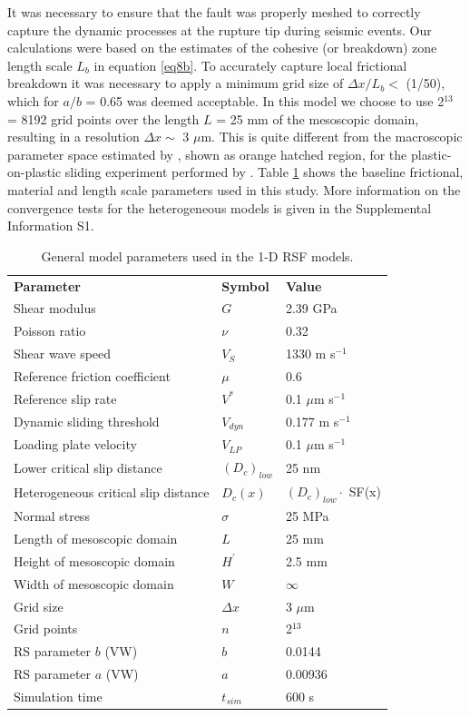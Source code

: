 \documentclass[preprint,1p, 10pt,authoryear]{elsarticle}
\begin{document}
It was necessary to ensure that the fault was properly meshed to correctly capture the dynamic processes at the rupture tip during seismic events. Our calculations were based on the estimates of the cohesive (or breakdown) zone length scale $L_{b}$ in equation \eqref{eq8b}. To accurately capture local frictional breakdown it was necessary to apply a minimum grid size of $\Delta x/L_{b} <$ (1/50), which for $a/b$ = 0.65 was deemed acceptable.  In this model we choose to use 2$^{13}$ = 8192 grid points over the length $L$ = 25 mm of the mesoscopic domain, resulting in a resolution $\Delta x \sim$  3 $\mu$m. This is quite different from the macroscopic parameter space estimated by \citet{Kaneko2016}, shown as orange hatched region, for the plastic-on-plastic sliding experiment performed by \citet{Latour2013}. Table \ref{table1} shows the baseline frictional, material and length scale parameters used in this study. More information on the convergence tests for the heterogeneous models is given in the Supplemental Information S1.

\begin{table}[ht]
	\centering
	\caption{General model parameters used in the 1-D RSF models.}
	\begin{tabular}{ m{5cm} m{2cm} m{4cm}} 
		\hline  
		\bf{Parameter} 			& \bf{Symbol} 		& \bf{Value}	\\
		Shear modulus  			& $G$  		 	& 2.39 GPa		\\
		Poisson ratio  			& $\nu$  	 	& 0.32 		\\
		Shear wave speed		& $V_{S}$      		& 1330 m s$^{-1}$	\\
		Reference friction coefficient	& $\mu$	        & 0.6	\\
		Reference slip rate  		& $V^{*}$     		&  0.1 $\mu$m s$^{-1}$\\
		Dynamic sliding threshold   	& $V_{dyn}$  		& 0.177 m s$^{-1}$ \\
		Loading plate velocity  	& $V_{LP}$     		&  0.1 $\mu$m s$^{-1}$\\
		Lower critical slip distance 	& $\left(D_{c}\right)_{low}$    &  25 nm\\
        Heterogeneous critical slip distance 	& $D_{c}(x)$    &  $\left(D_{c}\right)_{low} \cdot$ SF(x)\\
  		Normal stress 			& $\sigma$  		&  25 MPa \\
		Length of mesoscopic domain 	&   $L$  		& 25 mm\\
		Height of mesoscopic domain 	&   $H^{'}$  		& 2.5 mm\\
		Width of mesoscopic domain 	&   $W$   		& $\infty$\\
		Grid size 			& $\Delta x$ 		& 3 $\mu$m \\
		Grid points 			& $n$ 			& 2$^{13}$ \\
		RS parameter $b$ (VW)  		& $b$ 			& 0.0144  \\
		RS parameter $a$ (VW)  		& $a$ 			& 0.00936  \\
	    Simulation time 			& $t_{sim}$ 		& 600 s  \\
		\hline  	
	\end{tabular}
	\label{table1}
\end{table}
\end{document}
